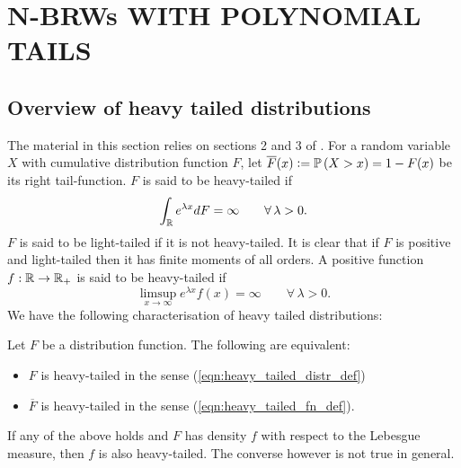 \section{N-BRWs WITH POLYNOMIAL TAILS}\label{sec:poly}

\subsection{Overview of heavy tailed distributions}\label{sec:heavy_tailed_overview}
The material in this section relies on sections 2 and 3 of \cite{foss2011introduction}. For a random variable $X$ with cumulative distribution function $F$, let $\overline{F}(x) \vcentcolon= \mathbb{P} \left( X > x \right) = 1 - F(x)$ be its right tail-function. $F$ is said to be heavy-tailed if 
\begin{equation}\label{eqn:heavy_tailed_distr_def}
\int_{\mathbb{R}} e^{\lambda x} dF = \infty\qquad\forall\, \lambda > 0. 
\end{equation}
$F$ is said to be light-tailed if it is not heavy-tailed. It is clear that if $F$ is positive and light-tailed then it has finite moments of all orders. A positive function $f : \mathbb{R} \to \mathbb{R}_+$ is said to be heavy-tailed if 
\begin{equation}\label{eqn:heavy_tailed_fn_def}
\limsup\limits_{x \to \infty} e^{\lambda x} f(x) = \infty\qquad\forall\,\lambda > 0. 
\end{equation}
We have the following characterisation of heavy tailed distributions:

\begin{theorem}
Let $F$ be a distribution function. The following are equivalent:
\begin{itemize}
\item $F$ is heavy-tailed in the sense (\ref{eqn:heavy_tailed_distr_def})
\item $\overline{F}$ is heavy-tailed in the sense (\ref{eqn:heavy_tailed_fn_def}). 
\end{itemize}
If any of the above holds and $F$ has density $f$ with respect to the Lebesgue measure, then $f$ is also heavy-tailed. The converse however is not true in general. 
\end{theorem}

